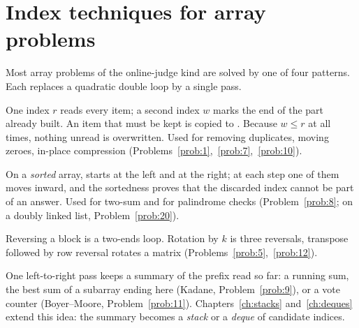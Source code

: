 \section{Index techniques for array problems}\label{sec:arraytech}

Most array problems of the online-judge kind are solved by one of four patterns. Each
replaces a quadratic double loop by a single pass.

 One index $r$ reads every item; a second index $w$ marks
the end of the part already built. An item that must be kept is copied to .
Because $w\le r$ at all times, nothing unread is overwritten. Used for removing
duplicates, moving zeroes, in-place compression (Problems~\ref{prob:1},~\ref{prob:7},~\ref{prob:10}).

 On a \emph{sorted} array,  starts at the left
and  at the right; at each step one of them moves inward, and the sortedness proves
that the discarded index cannot be part of an answer. Used for two-sum and for palindrome
checks (Problem~\ref{prob:8}; on a doubly linked list, Problem~\ref{prob:20}).

 Reversing a block is a two-ends loop. Rotation by $k$ is three
reversals, transpose followed by row reversal rotates a matrix
(Problems~\ref{prob:5},~\ref{prob:12}).

 One left-to-right pass keeps a summary of the prefix read so
far: a running sum, the best sum of a subarray ending here (Kadane, Problem~\ref{prob:9}),
or a vote counter (Boyer--Moore, Problem~\ref{prob:11}). Chapters~\ref{ch:stacks}
and~\ref{ch:deques} extend this idea: the summary becomes a \emph{stack} or a
\emph{deque} of candidate indices.
